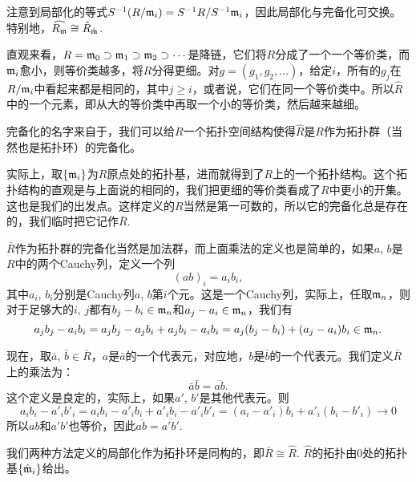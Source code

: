 注意到局部化的等式$S^{-1}(R/\mathfrak{m}_i)=S^{-1}R/S^{-1}\mathfrak{m}_i$，因此局部化与完备化可交换。特别地，$\widehat{R_{\mathfrak{m}}}\cong \hat{R}_{\hat{\mathfrak{m}}}$.

直观来看，$R=\mathfrak{m}_0\supset \mathfrak{m}_1\supset \mathfrak{m}_2\supset \cdots$是降链，它们将$R$分成了一个一个等价类，而$\mathfrak{m}_i$愈小，则等价类越多，将$R$分得更细。对$g=(g_1,g_2,\dots)$，给定$i$，所有的$g_j$在$R/\mathfrak{m}_i$中看起来都是相同的，其中$j\geq i$，或者说，它们在同一个等价类中。所以$\hat R$中的一个元素，即从大的等价类中再取一个小的等价类，然后越来越细。

\begin{para}
完备化的名字来自于，我们可以给$R$一个拓扑空间结构使得$\hat R$是$R$作为拓扑群（当然也是拓扑环）的完备化。

实际上，取$\{\mathfrak{m}_i\}$为$R$原点处的拓扑基，进而就得到了$R$上的一个拓扑结构。这个拓扑结构的直观是与上面说的相同的，我们把更细的等价类看成了$R$中更小的开集。这也是我们的出发点。这样定义的$R$当然是第一可数的，所以它的完备化总是存在的，我们临时把它记作$\bar{R}$. 

$\bar{R}$作为拓扑群的完备化当然是加法群，而上面乘法的定义也是简单的，如果$a$, $b$是$R$中的两个Cauchy列，定义一个列
\[
	(ab)_i=a_ib_i,
\]
其中$a_i$, $b_i$分别是Cauchy列$a$, $b$第$i$个元。这是一个Cauchy列，实际上，任取$\mathfrak{m}_n$，则对于足够大的$i$, $j$都有$b_j-b_i\in \mathfrak{m}_n$和$a_j-a_i\in \mathfrak{m}_n$，我们有
\[
	a_jb_j-a_ib_i=a_jb_j-a_jb_i+a_jb_i-a_ib_i=a_j(b_j-b_i)+(a_j-a_i)b_i\in \mathfrak{m}_n.
\]

现在，取$\bar{a}$, $\bar{b}\in \bar{R}$，$a$是$\bar{a}$的一个代表元，对应地，$b$是$\bar{b}$的一个代表元。我们定义$\bar{R}$上的乘法为：
\[
	\bar{a}\bar{b}=\overline{ab}.
\]
这个定义是良定的，实际上，如果$a'$, $b'$是其他代表元。则
\[
	a_ib_i-a'_ib'_i=a_ib_i-a'_ib_i+a'_ib_i-a'_ib'_i=(a_i-a'_i)b_i+a'_i(b_i-b'_i)\to 0
\]
所以$ab$和$a'b'$也等价，因此$\overline{ab}=\overline{a'b'}$.
\end{para}

\begin{pro}
	我们两种方法定义的局部化作为拓扑环是同构的，即$\bar{R}\cong \hat R$. $\hat R$的拓扑由$0$处的拓扑基$\{\hat {\mathfrak{m}}_i\}$给出。
\end{pro}

